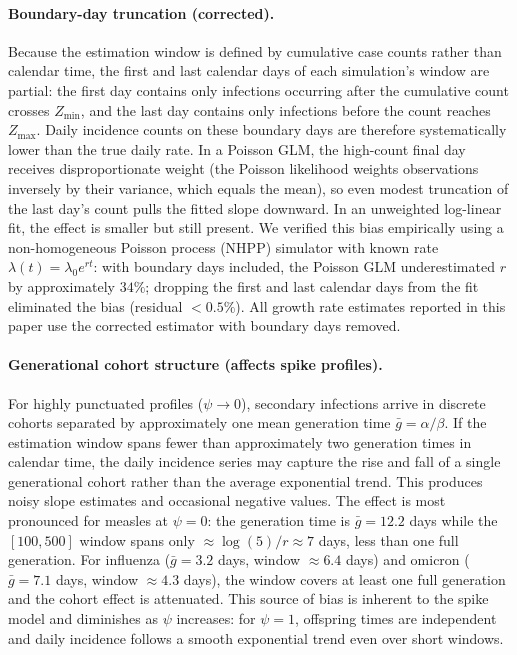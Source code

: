 \paragraph{Boundary-day truncation (corrected).} Because the estimation window is defined by cumulative case counts rather than calendar time, the first and last calendar days of each simulation's window are partial: the first day contains only infections occurring after the cumulative count crosses $Z_{\min}$, and the last day contains only infections before the count reaches $Z_{\max}$. Daily incidence counts on these boundary days are therefore systematically lower than the true daily rate. In a Poisson GLM, the high-count final day receives disproportionate weight (the Poisson likelihood weights observations inversely by their variance, which equals the mean), so even modest truncation of the last day's count pulls the fitted slope downward. In an unweighted log-linear fit, the effect is smaller but still present. We verified this bias empirically using a non-homogeneous Poisson process (NHPP) simulator with known rate $\lambda(t) = \lambda_0 e^{rt}$: with boundary days included, the Poisson GLM underestimated $r$ by approximately $34\%$; dropping the first and last calendar days from the fit eliminated the bias (residual $< 0.5\%$). All growth rate estimates reported in this paper use the corrected estimator with boundary days removed.

\paragraph{Generational cohort structure (affects spike profiles).} For highly punctuated profiles ($\psi \to 0$), secondary infections arrive in discrete cohorts separated by approximately one mean generation time $\bar{g} = \alpha/\beta$. If the estimation window spans fewer than approximately two generation times in calendar time, the daily incidence series may capture the rise and fall of a single generational cohort rather than the average exponential trend. This produces noisy slope estimates and occasional negative values. The effect is most pronounced for measles at $\psi = 0$: the generation time is $\bar{g} = 12.2$ days while the $[100, 500]$ window spans only $\approx \log(5)/r \approx 7$ days, less than one full generation. For influenza ($\bar{g} = 3.2$ days, window $\approx 6.4$ days) and omicron ($\bar{g} = 7.1$ days, window $\approx 4.3$ days), the window covers at least one full generation and the cohort effect is attenuated. This source of bias is inherent to the spike model and diminishes as $\psi$ increases: for $\psi = 1$, offspring times are independent and daily incidence follows a smooth exponential trend even over short windows.

